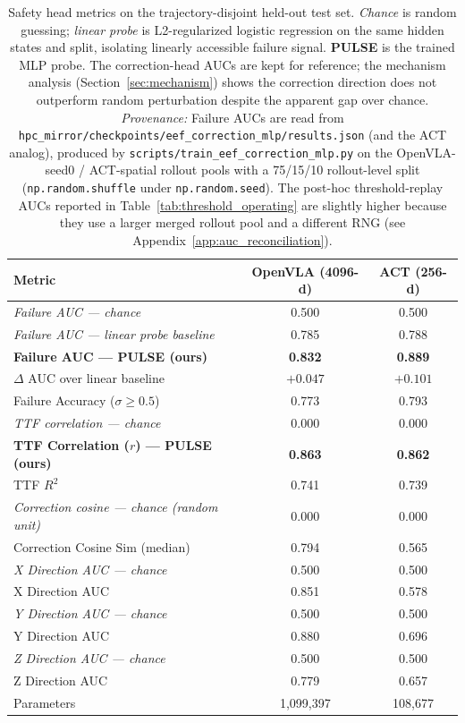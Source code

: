 \begin{table}[t]
\centering
\caption{Safety head metrics on the trajectory-disjoint held-out test set. \emph{Chance} is random guessing; \emph{linear probe} is L2-regularized logistic regression on the same hidden states and split, isolating linearly accessible failure signal. \textbf{PULSE} is the trained MLP probe. The correction-head AUCs are kept for reference; the mechanism analysis (Section~\ref{sec:mechanism}) shows the correction direction does not outperform random perturbation despite the apparent gap over chance. \emph{Provenance:} Failure AUCs are read from \texttt{hpc\_mirror/checkpoints/eef\_correction\_mlp/results.json} (and the ACT analog), produced by \texttt{scripts/train\_eef\_correction\_mlp.py} on the OpenVLA-seed0 / ACT-spatial rollout pools with a 75/15/10 rollout-level split (\texttt{np.random.shuffle} under \texttt{np.random.seed}). The post-hoc threshold-replay AUCs reported in Table~\ref{tab:threshold_operating} are slightly higher because they use a larger merged rollout pool and a different RNG (see Appendix~\ref{app:auc_reconciliation}).}
\label{tab:safety_head_metrics}
\begin{tabular}{lcc}
\toprule
Metric & OpenVLA (4096-d) & ACT (256-d) \\
\midrule
\textit{Failure AUC --- chance} & 0.500 & 0.500 \\
\textit{Failure AUC --- linear probe baseline} & 0.785 & 0.788 \\
\textbf{Failure AUC --- PULSE (ours)} & \textbf{0.832} & \textbf{0.889} \\
$\Delta$ AUC over linear baseline & $+0.047$ & $+0.101$ \\
\midrule[0.4pt] Failure Accuracy ($\sigma{\geq}0.5$) & 0.773 & 0.793 \\
\midrule[0.4pt] \textit{TTF correlation --- chance} & 0.000 & 0.000 \\
\textbf{TTF Correlation ($r$) --- PULSE (ours)} & \textbf{0.863} & \textbf{0.862} \\
TTF $R^2$ & 0.741 & 0.739 \\
\midrule[0.4pt] \textit{Correction cosine --- chance (random unit)} & 0.000 & 0.000 \\
Correction Cosine Sim (median) & 0.794 & 0.565 \\
\textit{X Direction AUC --- chance} & 0.500 & 0.500 \\
X Direction AUC & 0.851 & 0.578 \\
\textit{Y Direction AUC --- chance} & 0.500 & 0.500 \\
Y Direction AUC & 0.880 & 0.696 \\
\textit{Z Direction AUC --- chance} & 0.500 & 0.500 \\
Z Direction AUC & 0.779 & 0.657 \\
\midrule[0.4pt] Parameters & 1,099,397 & 108,677 \\
\bottomrule
\end{tabular}
\end{table}
